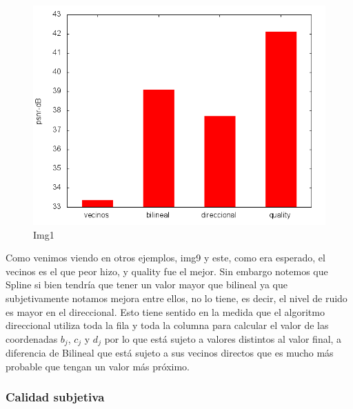 {\begin{figure}[h]
       \includegraphics[scale=0.8]{imagenes/quality_performance.png}
       \caption{Img1}
\end{figure}

Como venimos viendo en otros ejemplos, img9 y este, como era esperado, el vecinos es el que peor hizo, y quality fue el mejor. Sin embargo notemos que Spline si bien 
tendría que tener un valor mayor que bilineal ya que subjetivamente notamos mejora entre ellos, no lo tiene, es 
decir, el nivel de ruido es mayor en el direccional. Esto tiene sentido en la medida que el algoritmo direccional 
utiliza toda la fila y toda la columna para calcular el valor de las coordenadas $b_j$, $c_j$ y $d_j$ por lo que está 
sujeto a valores distintos al valor final, a diferencia de Bilineal que está sujeto a sus vecinos directos que es 
mucho más probable que tengan un valor más próximo. 

\subsubsection{Calidad subjetiva}

}
